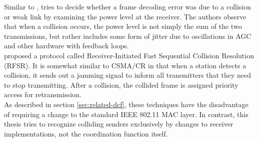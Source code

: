 Similar to \cite{zhu2015}, \cite{chua2016} tries to decide whether a frame decoding error was due to a collision or weak link by examining the power level at the receiver. The authors observe that when a collision occurs, the power level is not simply the sum of the two transmissions, but rather includes some form of jitter due to oscillations in \gls{AGC} and other hardware with feedback loops.\\

\cite{jibukumar2015} proposed a protocol called Receiver-Initiated Fast Sequential Collision Resolution (RFSR). It is somewhat similar to CSMA/CR \cite{choi2013} in that when a station detects a collision, it sends out a jamming signal to inform all transmitters that they need to stop transmitting. After a collision, the collided frame is assigned priority access for retransmission.\\

As described in section \ref{sec:related-dcf}, these techniques have the disadvantage of requiring a change to the standard IEEE 802.11 \gls{MAC} layer. In contrast, this thesis tries to recognize colliding senders exclusively by changes to receiver implementations, not the coordination function itself.
